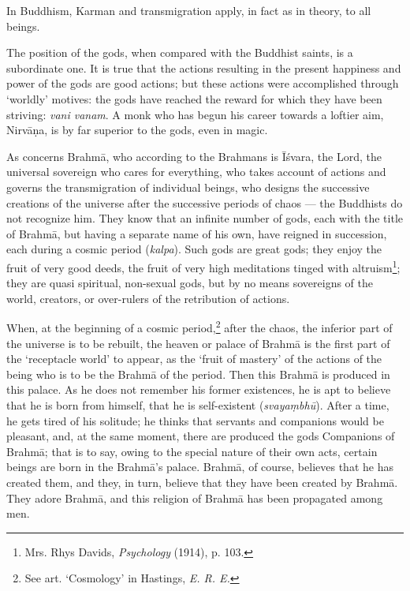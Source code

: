 \documentclass[a4paper, 11pt, oneside, english, landscape]{article}
\begin{document}
In Buddhism, Karman and transmigration apply, in fact as in theory, to all beings.

The position of the gods, when compared with the Buddhist saints, is a subordinate one. It is true that the actions resulting in the present happiness and power of the gods are good actions; but these actions were accomplished through `worldly' motives: the gods have reached the reward for which they have been striving: \emph{vani vanam}. A monk who has begun his career towards a loftier aim, Nirvāṇa, is by far superior to the gods, even in magic.

As concerns Brahmā, who according to the Brahmans is Īśvara, the Lord, the universal sovereign who cares for everything, who takes account of actions and governs the transmigration of individual beings, who designs the successive creations of the universe after the successive periods of chaos --- the Buddhists do not recognize him. They know that an infinite number of gods, each with the title of Brahmā, but having a separate name of his own, have reigned in succession, each during a cosmic period (\emph{kalpa}). Such gods are great gods; they enjoy the fruit of very good deeds, the fruit of very high meditations tinged with altruism\footnote{Mrs. Rhys Davids, \emph{Psychology} (1914), p. 103.}; they are quasi spiritual, non-sexual gods, but by no means sovereigns of the world, creators, or over-rulers of the retribution of actions.

When, at the beginning of a cosmic period,\footnote{See art. `Cosmology' in Hastings, \emph{E. R. E.}} after the chaos, the inferior part of the universe is to be rebuilt, the heaven or palace of Brahmā is the first part of the `receptacle world' to appear, as the `fruit of mastery' of the actions of the being who is to be the Brahmā of the period. Then this Brahmā is produced in this palace. As he does not remember his former existences, he is apt to believe that he is born from himself, that he is self-existent (\emph{svayaṃbhū}). After a time, he gets tired of his solitude; he thinks that servants and companions would be pleasant, and, at the same moment, there are produced the gods Companions of Brahmā; that is to say, owing to the special nature of their own acts, certain beings are born in the Brahmā's palace. Brahmā, of course, believes that he has created them, and they, in turn, believe that they have been created by Brahmā. They adore Brahmā, and this religion of Brahmā has been propagated among men.
\end{document}
